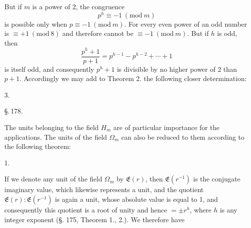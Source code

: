 
But if $m$ is a power of 2, the congruence
\[
p^h \equiv -1 \ (\mathrm{mod}\ m)
\]
is possible only when $p \equiv -1\ (\mathrm{mod}\ m)$. For every even power of an odd number is $\equiv + 1\ (\mathrm{mod}\ 8)$ and therefore cannot be $\equiv -1\ (\mathrm{mod}\ m)$. But if $h$ is odd, then
\[
\frac{p^h + 1}{p + 1} = p^{h-1} - p^{h-2} + \cdots + 1
\]
is itself odd, and consequently $p^h + 1$ is divisible by no higher power of 2 than $p + 1$. Accordingly we may add to Theorem 2. the following closer determination:

3. 


\begin{center}
\S.\,178.\\[4pt]
\end{center}

The units belonging to the field $H_m$ are of particular importance for the applications. The units of the field $\Omega_m$ can also be reduced to them according to the following theorem:

1. 

If we denote any unit of the field $\Omega_m$ by $\mathfrak{E}(r)$, then $\mathfrak{E}(r^{-1})$ is the conjugate imaginary value, which likewise represents a unit, and the quotient $\mathfrak{E}(r) : \mathfrak{E}(r^{-1})$ is again a unit, whose absolute value
is equal to 1, and consequently this quotient is a root of unity and hence $= \pm r^h$, where $h$ is any integer exponent (§. 175, Theorem 1., 2.). We therefore have
